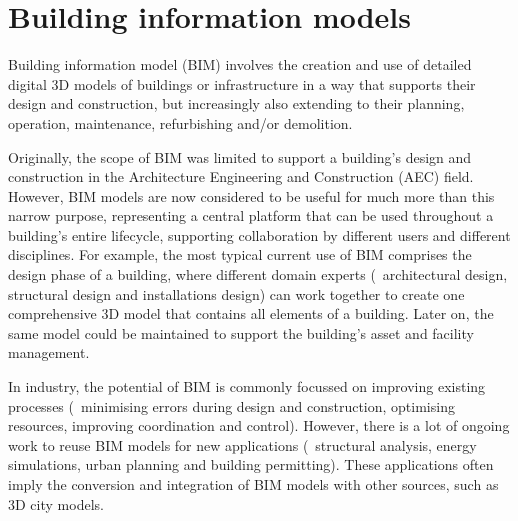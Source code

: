 
\setchapterpreamble[u]{\margintoc}

\graphicspath{{bim/}}

\chapter{Building information models}%
\label{chap:bim}

Building information model (BIM) involves the creation and use of detailed digital 3D models of buildings or infrastructure in a way that supports their design and construction, but increasingly also extending to their planning, operation, maintenance, refurbishing and/or demolition.

Originally, the scope of BIM was limited to support a building's design and construction in the Architecture Engineering and Construction (AEC) field.
However, BIM models are now considered to be useful for much more than this narrow purpose, representing a central platform that can be used throughout a building's entire lifecycle, supporting collaboration by different users and different disciplines.
For example, the most typical current use of BIM comprises the design phase of a building, where different domain experts (\eg\ architectural design, structural design and installations design) can work together to create one comprehensive 3D model that contains all elements of a building.
Later on, the same model could be maintained to support the building's asset and facility management.

In industry, the potential of BIM is commonly focussed on improving existing processes (\eg\ minimising errors during design and construction, optimising resources, improving coordination and control).
However, there is a lot of ongoing work to reuse BIM models for new applications (\eg\ structural analysis, energy simulations, urban planning and building permitting).
These applications often imply the conversion and integration of BIM models with other sources, such as 3D city models.



